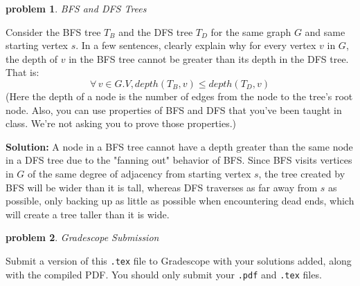 \documentclass[10pt]{article}
\newcommand{\solution}[1]{\color{blue}\hfill\break\noindent\textbf{Solution:} #1\color{black}}
\newtheorem{problem}{\sc\color{cit}problem}
\begin{document}
\begin{problem} BFS and DFS Trees \end{problem}

Consider the BFS tree $T_B$ and the DFS tree $T_D$ for the same graph $G$ and same starting vertex $s$.
In a few sentences, clearly explain why for every vertex $v$ in $G$, the depth of $v$ in the BFS tree cannot be greater than its depth in the DFS tree. That is:
$$ \forall \, v \in G.V, depth(T_B, v) \leq depth(T_D, v)$$
(Here the depth of a node is the number of edges from the node to the tree's root node. Also, you can use properties of BFS and DFS that you've been taught in class. We're not asking you to prove those properties.)

\solution{
    A node in a BFS tree cannot have a depth greater than the same node in a DFS tree due to the "fanning out" behavior of BFS. Since BFS visits vertices in $G$ of the same degree of adjacency from starting vertex $s$, the tree created by BFS will be wider than it is tall, whereas DFS traverses as far away from $s$ as possible, only backing up as little as possible when encountering dead ends, which will create a tree taller than it is wide. 
}


\begin{problem} Gradescope Submission \end{problem}
Submit a version of this \verb|.tex| file to Gradescope with your solutions added, along with the compiled PDF.  You should only submit your \verb|.pdf| and \verb|.tex| files.
\end{document}
